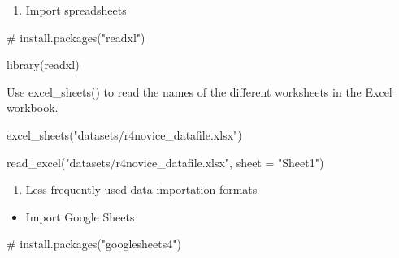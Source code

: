 \documentclass[
  letterpaper,
  DIV=11,
  numbers=noendperiod]{scrreprt}
\newenvironment{Shaded}{}{}
\newcommand{\AttributeTok}[1]{\textcolor[rgb]{0.84,0.23,0.29}{#1}}
\newcommand{\CommentTok}[1]{\textcolor[rgb]{0.42,0.45,0.49}{#1}}
\newcommand{\FunctionTok}[1]{\textcolor[rgb]{0.44,0.26,0.76}{#1}}
\newcommand{\NormalTok}[1]{\textcolor[rgb]{0.14,0.16,0.18}{#1}}
\newcommand{\StringTok}[1]{\textcolor[rgb]{0.01,0.18,0.38}{#1}}
\providecommand{\tightlist}{%
  \setlength{\itemsep}{0pt}\setlength{\parskip}{0pt}}\usepackage{longtable,booktabs,array}
\begin{document}
\begin{enumerate}
\def\labelenumi{\alph{enumi}.}
\setcounter{enumi}{1}
\tightlist
\item
  Import spreadsheets
\end{enumerate}

\begin{Shaded}
\begin{Highlighting}[]
\CommentTok{\# install.packages("readxl")}
\end{Highlighting}
\end{Shaded}

\begin{Shaded}
\begin{Highlighting}[]
\FunctionTok{library}\NormalTok{(readxl)}
\end{Highlighting}
\end{Shaded}

Use excel\_sheets() to read the names of the different worksheets in the
Excel workbook.

\begin{Shaded}
\begin{Highlighting}[]
\FunctionTok{excel\_sheets}\NormalTok{(}\StringTok{"datasets/r4novice\_datafile.xlsx"}\NormalTok{)}
\end{Highlighting}
\end{Shaded}

\begin{Shaded}
\begin{Highlighting}[]
\FunctionTok{read\_excel}\NormalTok{(}\StringTok{"datasets/r4novice\_datafile.xlsx"}\NormalTok{, }\AttributeTok{sheet =} \StringTok{"Sheet1"}\NormalTok{)}
\end{Highlighting}
\end{Shaded}

\begin{enumerate}
\def\labelenumi{\arabic{enumi}.}
\setcounter{enumi}{1}
\tightlist
\item
  Less frequently used data importation formats
\end{enumerate}

\begin{itemize}
\tightlist
\item
  Import Google Sheets
\end{itemize}

\begin{Shaded}
\begin{Highlighting}[]
\CommentTok{\# install.packages("googlesheets4")}
\end{Highlighting}
\end{Shaded}
\end{document}
